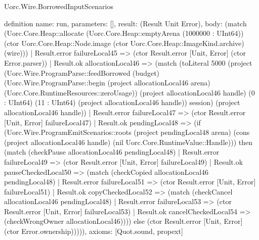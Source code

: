 \begin{lexlean}{Uorc.Wire.BorrowedInputScenarios}
\begin{semanticmodule}
definition{
  name: run,
  parameters: [],
  result: (Result Unit Error),
  body: (match (Uorc.Core.Heap::allocate (Uorc.Core.Heap::emptyArena (1000000 : UInt64)) (ctor Uorc.Core.Heap::Node.image (ctor Uorc.Core.Heap::ImageKind.archive) (wire)))
    | Result.error failureLocal45 => (ctor Result.error [Unit, Error] (ctor Error.parser))
    | Result.ok allocationLocal46 => (match (toLiteral 5000 (project (Uorc.Wire.ProgramParse::feedBorrowed (budget) (Uorc.Wire.ProgramParse::begin (project allocationLocal46 arena) (Uorc.Core.RuntimeResources::zeroUsage)) (project allocationLocal46 handle) (0 : UInt64) (11 : UInt64) (project allocationLocal46 handle)) session) (project allocationLocal46 handle))
      | Result.error failureLocal47 => (ctor Result.error [Unit, Error] failureLocal47)
      | Result.ok pendingLocal48 => (if (Uorc.Wire.ProgramEmitScenarios::roots (project pendingLocal48 arena) (cons (project allocationLocal46 handle) (nil Uorc.Core.RuntimeValue::Handle))) then (match (checkPause allocationLocal46 pendingLocal48)
        | Result.error failureLocal49 => (ctor Result.error [Unit, Error] failureLocal49)
        | Result.ok pauseCheckedLocal50 => (match (checkCopied allocationLocal46 pendingLocal48)
          | Result.error failureLocal51 => (ctor Result.error [Unit, Error] failureLocal51)
          | Result.ok copyCheckedLocal52 => (match (checkCancel allocationLocal46 pendingLocal48)
            | Result.error failureLocal53 => (ctor Result.error [Unit, Error] failureLocal53)
            | Result.ok cancelCheckedLocal54 => (checkWrongOwner allocationLocal46)))) else (ctor Result.error [Unit, Error] (ctor Error.ownership))))),
  axioms: [Quot.sound, propext]
}
\end{semanticmodule}
\end{lexlean}
